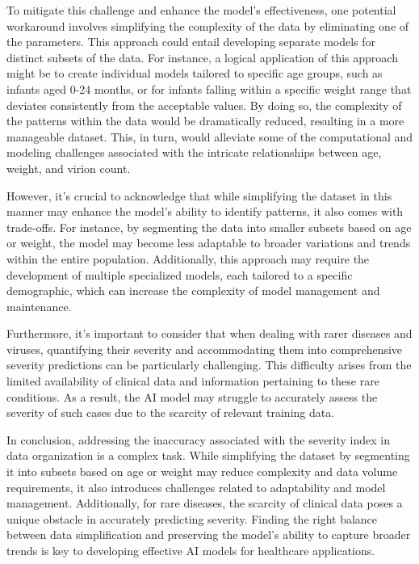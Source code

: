 \documentclass{article}
\begin{document}
To mitigate this challenge and enhance the model's effectiveness, one potential
workaround involves simplifying the complexity of the data by eliminating one of the
parameters. This approach could entail developing separate models for distinct subsets of
the data. For instance, a logical application of this approach might be to create individual
models tailored to specific age groups, such as infants aged 0-24 months, or for infants
falling within a specific weight range that deviates consistently from the acceptable
values. By doing so, the complexity of the patterns within the data would be dramatically
reduced, resulting in a more manageable dataset. This, in turn, would alleviate some of
the computational and modeling challenges associated with the intricate relationships
between age, weight, and virion count.

However, it's crucial to acknowledge that while simplifying the dataset in this
manner may enhance the model's ability to identify patterns, it also comes with
trade-offs. For instance, by segmenting the data into smaller subsets based on age or
weight, the model may become less adaptable to broader variations and trends within the
entire population. Additionally, this approach may require the development of multiple
specialized models, each tailored to a specific demographic, which can increase the
complexity of model management and maintenance.

Furthermore, it's important to consider that when dealing with rarer diseases and
viruses, quantifying their severity and accommodating them into comprehensive severity
predictions can be particularly challenging. This difficulty arises from the limited
availability of clinical data and information pertaining to these rare conditions. As a result, the AI model may struggle to accurately assess the severity of such cases due to
the scarcity of relevant training data.

In conclusion, addressing the inaccuracy associated with the severity index in data
organization is a complex task. While simplifying the dataset by segmenting it into
subsets based on age or weight may reduce complexity and data volume requirements, it
also introduces challenges related to adaptability and model management. Additionally,
for rare diseases, the scarcity of clinical data poses a unique obstacle in accurately
predicting severity. Finding the right balance between data simplification and preserving
the model's ability to capture broader trends is key to developing effective AI models for
healthcare applications.
\end{document}
